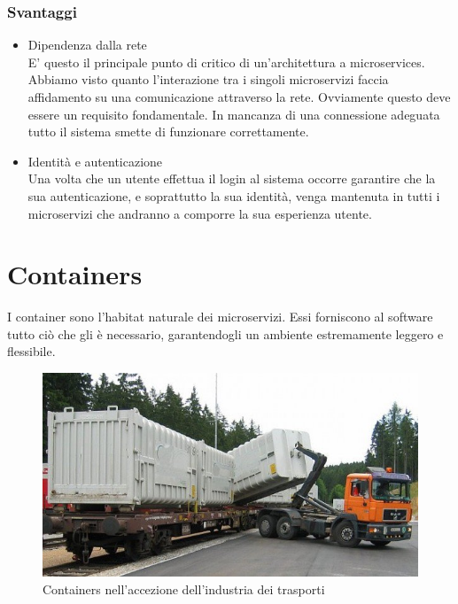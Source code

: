 \subsubsection{Svantaggi}
\begin{itemize}
	\item Dipendenza dalla rete \\
	E' questo il principale punto di critico di un'architettura a microservices. Abbiamo visto quanto l'interazione tra i singoli microservizi faccia affidamento su una comunicazione attraverso la rete. Ovviamente questo deve essere un requisito fondamentale. In mancanza di una connessione adeguata tutto il sistema smette di funzionare correttamente.
	
	\item Identità e autenticazione \\
	Una volta che un utente effettua il login al sistema occorre garantire che la sua autenticazione, e soprattutto la sua identità, venga mantenuta in tutti i microservizi che andranno a comporre la sua esperienza utente.
\end{itemize}

\section{Containers}
I container sono l'habitat naturale dei microservizi. Essi forniscono al software tutto ciò che gli è necessario, garantendogli un ambiente estremamente leggero e flessibile.

\begin{figure}[h!]
	\centering
	\includegraphics[width=\textwidth,keepaspectratio=true]{capitoli/imgs/spostamentocontainer.png}
	\caption{Containers nell'accezione dell'industria dei trasporti}
\end{figure}

